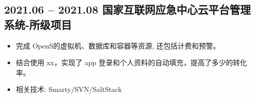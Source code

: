 \documentclass{resume}
\begin{document}
\subsection{{2021.06 -- 2021.08} \hspace{2cm}\textbf{国家互联网应急中心云平台管理系统-所级项目}}
    \begin{normalsize}
      \begin{itemize}
        \item 完成 OpenS的虚拟机、数据库和容器等资源, 还包括计费和预警。
        \item 结合使用 xx，实现了 app 登录和个人资料的自动填充，提高了多少的转化率。
        \item 相关技术: Smarty/SVN/SaltStack  
      \end{itemize}
    \end{normalsize}





\end{document}
